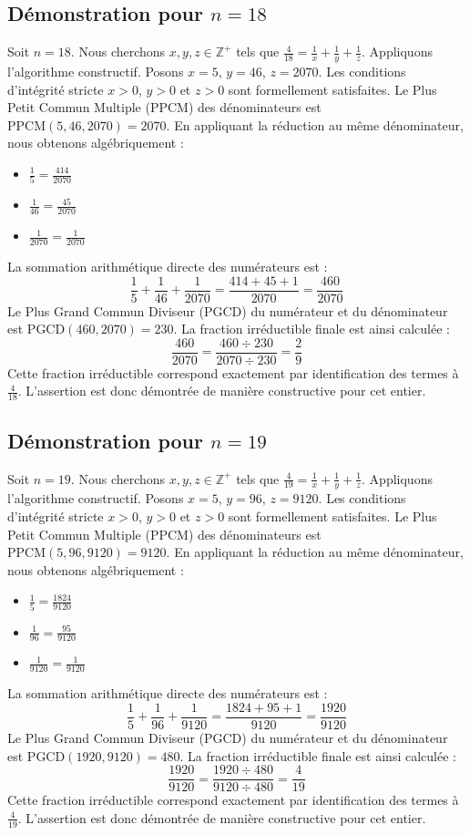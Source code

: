 \documentclass[11pt,a4paper]{article}
\begin{document}
\subsection{Démonstration pour $n = 18$}
Soit $n = 18$. Nous cherchons $x, y, z \in \mathbb{Z}^{+}$ tels que $\frac{4}{18} = \frac{1}{x} + \frac{1}{y} + \frac{1}{z}$.
Appliquons l'algorithme constructif. Posons $x = 5$, $y = 46$, $z = 2070$.
Les conditions d'intégrité stricte $x > 0$, $y > 0$ et $z > 0$ sont formellement satisfaites.
Le Plus Petit Commun Multiple (PPCM) des dénominateurs est $\text{PPCM}(5, 46, 2070) = 2070$.
En appliquant la réduction au même dénominateur, nous obtenons algébriquement :
\begin{itemize}
    \item $\frac{1}{5} = \frac{414}{2070}$
    \item $\frac{1}{46} = \frac{45}{2070}$
    \item $\frac{1}{2070} = \frac{1}{2070}$
\end{itemize}
La sommation arithmétique directe des numérateurs est :
$$ \frac{1}{5} + \frac{1}{46} + \frac{1}{2070} = \frac{414 + 45 + 1}{2070} = \frac{460}{2070} $$
Le Plus Grand Commun Diviseur (PGCD) du numérateur et du dénominateur est $\text{PGCD}(460, 2070) = 230$.
La fraction irréductible finale est ainsi calculée :
$$ \frac{460}{2070} = \frac{460 \div 230}{2070 \div 230} = \frac{2}{9} $$
Cette fraction irréductible correspond exactement par identification des termes à $\frac{4}{18}$. L'assertion est donc démontrée de manière constructive pour cet entier.

\subsection{Démonstration pour $n = 19$}
Soit $n = 19$. Nous cherchons $x, y, z \in \mathbb{Z}^{+}$ tels que $\frac{4}{19} = \frac{1}{x} + \frac{1}{y} + \frac{1}{z}$.
Appliquons l'algorithme constructif. Posons $x = 5$, $y = 96$, $z = 9120$.
Les conditions d'intégrité stricte $x > 0$, $y > 0$ et $z > 0$ sont formellement satisfaites.
Le Plus Petit Commun Multiple (PPCM) des dénominateurs est $\text{PPCM}(5, 96, 9120) = 9120$.
En appliquant la réduction au même dénominateur, nous obtenons algébriquement :
\begin{itemize}
    \item $\frac{1}{5} = \frac{1824}{9120}$
    \item $\frac{1}{96} = \frac{95}{9120}$
    \item $\frac{1}{9120} = \frac{1}{9120}$
\end{itemize}
La sommation arithmétique directe des numérateurs est :
$$ \frac{1}{5} + \frac{1}{96} + \frac{1}{9120} = \frac{1824 + 95 + 1}{9120} = \frac{1920}{9120} $$
Le Plus Grand Commun Diviseur (PGCD) du numérateur et du dénominateur est $\text{PGCD}(1920, 9120) = 480$.
La fraction irréductible finale est ainsi calculée :
$$ \frac{1920}{9120} = \frac{1920 \div 480}{9120 \div 480} = \frac{4}{19} $$
Cette fraction irréductible correspond exactement par identification des termes à $\frac{4}{19}$. L'assertion est donc démontrée de manière constructive pour cet entier.
\end{document}

